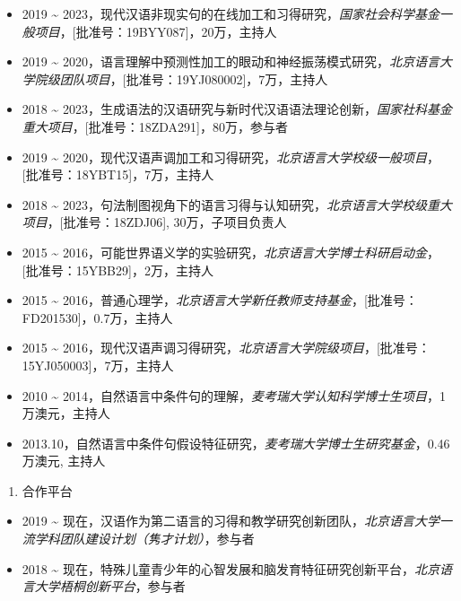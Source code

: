 \documentclass[
  12pt,
]{article}
\providecommand{\tightlist}{%
  \setlength{\itemsep}{0pt}\setlength{\parskip}{0pt}}
\begin{document}
\begin{itemize}
\item
  2019 \textasciitilde{}
  2023，现代汉语非现实句的在线加工和习得研究，\emph{国家社会科学基金一般项目}，{[}批准号：19BYY087{]}，20万，主持人
\item
  2019 \textasciitilde{}
  2020，语言理解中预测性加工的眼动和神经振荡模式研究，\emph{北京语言大学院级团队项目}，{[}批准号：19YJ080002{]}，7万，主持人
\item
  2018 \textasciitilde{}
  2023，生成语法的汉语研究与新时代汉语语法理论创新，\emph{国家社科基金重大项目}，{[}批准号：18ZDA291{]}，80万，参与者
\item
  2019 \textasciitilde{}
  2020，现代汉语声调加工和习得研究，\emph{北京语言大学校级一般项目}，{[}批准号：18YBT15{]}，7万，主持人
\item
  2018 \textasciitilde{}
  2023，句法制图视角下的语言习得与认知研究，\emph{北京语言大学校级重大项目}，{[}批准号：18ZDJ06{]},
  30万，子项目负责人
\item
  2015 \textasciitilde{}
  2016，可能世界语义学的实验研究，\emph{北京语言大学博士科研启动金}，{[}批准号：15YBB29{]}，2万，主持人
\item
  2015 \textasciitilde{}
  2016，普通心理学，\emph{北京语言大学新任教师支持基金}，{[}批准号：FD201530{]}，0.7万，主持人
\item
  2015 \textasciitilde{}
  2016，现代汉语声调习得研究，\emph{北京语言大学院级项目}，{[}批准号：15YJ050003{]}，7万，主持人
\item
  2010 \textasciitilde{}
  2014，自然语言中条件句的理解，\emph{麦考瑞大学认知科学博士生项目}，1万澳元，主持人
\item
  2013.10，自然语言中条件句假设特征研究，\emph{麦考瑞大学博士生研究基金}，0.46万澳元,
  主持人
\end{itemize}

\begin{enumerate}
\def\labelenumi{\arabic{enumi}.}
\setcounter{enumi}{1}
\tightlist
\item
  合作平台
\end{enumerate}

\begin{itemize}
\item
  2019 \textasciitilde{}
  现在，汉语作为第二语言的习得和教学研究创新团队，\emph{北京语言大学一流学科团队建设计划（隽才计划）}，参与者
\item
  2018 \textasciitilde{}
  现在，特殊儿童青少年的心智发展和脑发育特征研究创新平台，\emph{北京语言大学梧桐创新平台}，参与者
\end{itemize}
\end{document}
